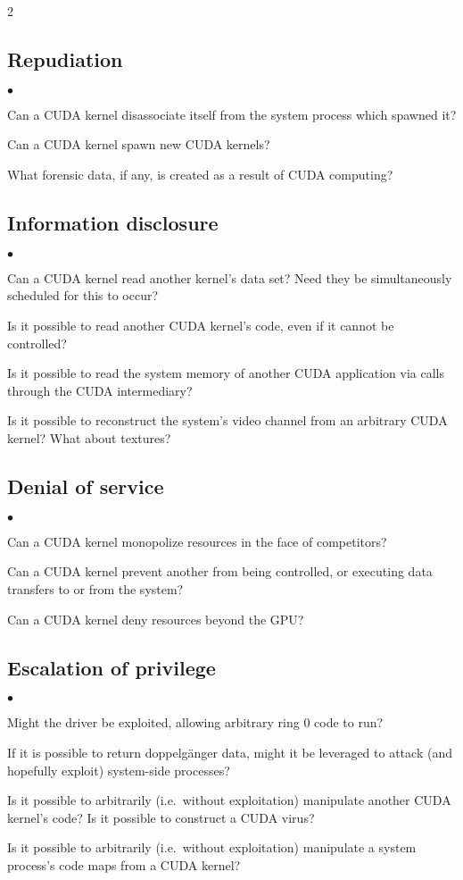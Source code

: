 \documentclass[letterpaper,10pt]{article}
\newcommand{\squishlist}{\begin{list}{$\bullet$}
  {\setlength{\itemsep}{0pt}
    \setlength{\parsep}{3pt}
    \setlength{\topsep}{3pt}
    \setlength{\partopsep}{0pt}
    \setlength{\leftmargin}{1.5em}
    \setlength{\labelwidth}{1em}
    \setlength{\labelsep}{0.5em}
  } }
\newcommand{\squishend}{\end{list}}
\begin{document}
\begin{multicols}{2}
\subsection{Repudiation}
\squishlist
\item Can a CUDA kernel disassociate itself from the system process which spawned it?
\item Can a CUDA kernel spawn new CUDA kernels?
\item What forensic data, if any, is created as a result of CUDA computing?
\squishend
\subsection{Information disclosure}
\squishlist
\item Can a CUDA kernel read another kernel's data set? Need they be simultaneously
scheduled for this to occur?
\item Is it possible to read another CUDA kernel's code, even if it cannot be
controlled?
\item Is it possible to read the system memory of another CUDA application via
calls through the CUDA intermediary?
\item Is it possible to reconstruct the system's video channel from an arbitrary
CUDA kernel? What about textures?
\squishend
\subsection{Denial of service}
\squishlist
\item Can a CUDA kernel monopolize resources in the face of competitors?
\item Can a CUDA kernel prevent another from being controlled, or executing
data transfers to or from the system?
\item Can a CUDA kernel deny resources beyond the GPU\@?
\squishend
\subsection{Escalation of privilege}
\squishlist
\item Might the driver be exploited, allowing arbitrary ring 0 code to run?
\item If it is possible to return doppelg\"anger data, might it be leveraged
to attack (and hopefully exploit) system-side processes?
\item Is it possible to arbitrarily (i.e.\ without exploitation) manipulate
another CUDA kernel's code? Is it possible to construct a CUDA virus?
\item Is it possible to arbitrarily (i.e.\ without exploitation) manipulate a
system process's code maps from a CUDA kernel?
\squishend


\end{multicols}
\end{document}
